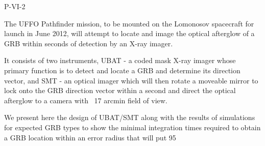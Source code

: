 P-VI-2


\bigskip



\bigskip

\noindent The UFFO Pathfinder mission, to be mounted on the Lomonosov spacecraft for launch in June 2012, will attempt to locate and image the optical afterglow of a GRB within seconds of detection by an X-ray imager.

It consists of two instruments, UBAT - a coded mask X-ray imager whose primary function is to detect and locate a GRB and determine its direction vector, and SMT - an optical imager which will then rotate a moveable mirror to lock onto the GRB direction vector within a second and direct the optical afterglow to a camera with ~17 arcmin field of view.

We present here the design of UBAT/SMT along with the results of simulations for expected GRB types to show the minimal integration times required to obtain a GRB location within an error radius that will put 95%

